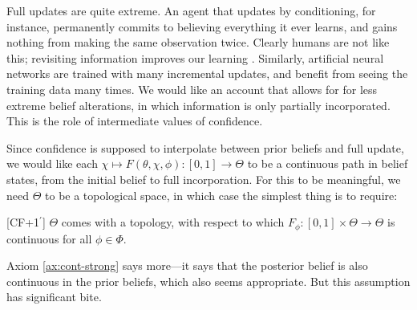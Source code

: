 Full updates are quite extreme.
An agent that updates by conditioning, for instance,
permanently commits to believing everything it ever learns,
and gains nothing from making the same observation twice.
Clearly humans are not like this; revisiting information
 	improves our learning \parencite{ausubel1965effect}.
Similarly, artificial neural networks are trained with
 	many incremental updates, and benefit from seeing 
	the training data many times.
We would like an account that allows for for less extreme belief alterations,
in which information is only partially incorporated.
This is the role of intermediate values of confidence.

Since confidence is supposed to interpolate between prior beliefs and full update,
we would like each $\chi \mapsto F(\theta,\chi,\phi) : [0,1] \to \Theta$
to be a continuous path in belief states, from the initial belief to full incorporation.
For this to be meaningful, we need $\Theta$ to be a topological space,
in which case the simplest thing is to require:


\begin{CFaxioms}[nosep]
	\item
	[CF{\the\numexpr\value{CFaxiomsi}+1\relax}${^\prime}$]
	$\Theta$ comes with a topology, with respect to which
	$F_\phi : [0,1] \times \Theta \to \Theta$ is continuous
	for all $\phi \in \Phi$.
	\label{ax:cont-strong}
\end{CFaxioms}

Axiom \cref{ax:cont-strong} says more---it says
that the posterior belief is also continuous in the prior beliefs, 
which also seems appropriate. But this assumption has significant bite.

